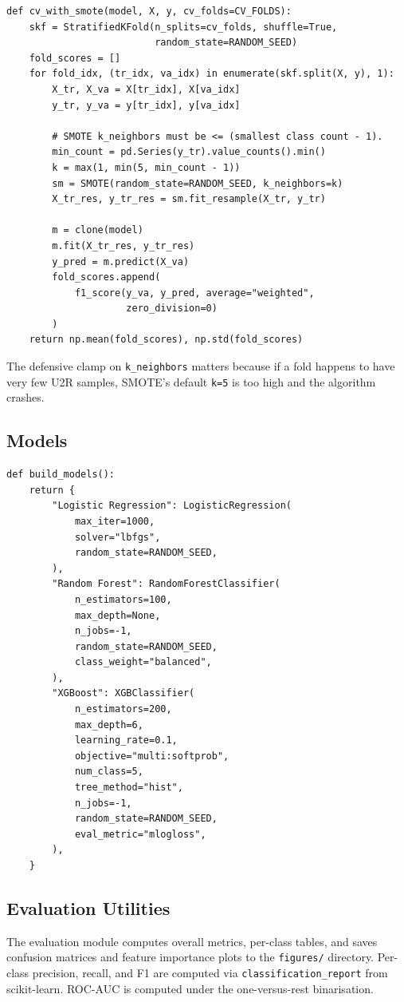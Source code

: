 \documentclass[11pt, a4paper]{article}
\begin{document}
\begin{lstlisting}[caption={Stratified k-fold CV with SMOTE inside each fold (run\_experiments.py).}]
def cv_with_smote(model, X, y, cv_folds=CV_FOLDS):
    skf = StratifiedKFold(n_splits=cv_folds, shuffle=True,
                          random_state=RANDOM_SEED)
    fold_scores = []
    for fold_idx, (tr_idx, va_idx) in enumerate(skf.split(X, y), 1):
        X_tr, X_va = X[tr_idx], X[va_idx]
        y_tr, y_va = y[tr_idx], y[va_idx]

        # SMOTE k_neighbors must be <= (smallest class count - 1).
        min_count = pd.Series(y_tr).value_counts().min()
        k = max(1, min(5, min_count - 1))
        sm = SMOTE(random_state=RANDOM_SEED, k_neighbors=k)
        X_tr_res, y_tr_res = sm.fit_resample(X_tr, y_tr)

        m = clone(model)
        m.fit(X_tr_res, y_tr_res)
        y_pred = m.predict(X_va)
        fold_scores.append(
            f1_score(y_va, y_pred, average="weighted",
                     zero_division=0)
        )
    return np.mean(fold_scores), np.std(fold_scores)
\end{lstlisting}

The defensive clamp on \texttt{k\_neighbors} matters because if a fold happens to have very few U2R samples, SMOTE's default \texttt{k=5} is too high and the algorithm crashes.

\subsection{Models}
\begin{lstlisting}[caption={Three classifiers under comparison (models.py).}]
def build_models():
    return {
        "Logistic Regression": LogisticRegression(
            max_iter=1000,
            solver="lbfgs",
            random_state=RANDOM_SEED,
        ),
        "Random Forest": RandomForestClassifier(
            n_estimators=100,
            max_depth=None,
            n_jobs=-1,
            random_state=RANDOM_SEED,
            class_weight="balanced",
        ),
        "XGBoost": XGBClassifier(
            n_estimators=200,
            max_depth=6,
            learning_rate=0.1,
            objective="multi:softprob",
            num_class=5,
            tree_method="hist",
            n_jobs=-1,
            random_state=RANDOM_SEED,
            eval_metric="mlogloss",
        ),
    }
\end{lstlisting}

\subsection{Evaluation Utilities}
The evaluation module computes overall metrics, per-class tables, and saves confusion matrices and feature importance plots to the \texttt{figures/} directory. Per-class precision, recall, and F1 are computed via \texttt{classification\_report} from scikit-learn. ROC-AUC is computed under the one-versus-rest binarisation.
\end{document}
